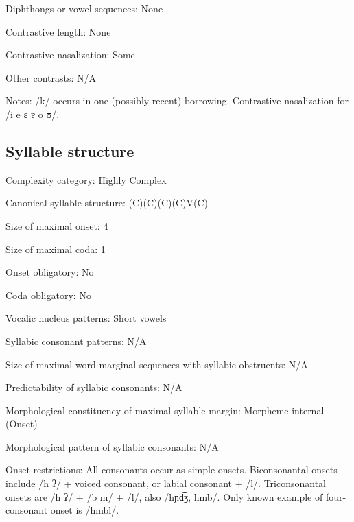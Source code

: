 {\begin{appendixdesc}
\item[Diphthongs or vowel sequences:] None

\item[Contrastive length:] None

\item[Contrastive nasalization:] Some

\item[Other contrasts:] N/A

\item[Notes:] /k/ occurs in one (possibly recent) borrowing. Contrastive nasalization for /i e ɛ ɐ o ʊ/.
\end{appendixdesc}
\subsection*{Syllable structure}
\begin{appendixdesc}

\item[Complexity category:] Highly Complex

\item[Canonical syllable structure:] (C)(C)(C)(C)V(C) \citep[68--76]{Marmion2010}

\item[Size of maximal onset:] 4

\item[Size of maximal coda:] 1

\item[Onset obligatory:] No

\item[Coda obligatory:] No

\item[Vocalic nucleus patterns:] Short vowels

\item[Syllabic consonant patterns:] N/A

\item[Size of maximal word-marginal sequences with syllabic obstruents:] N/A

\item[Predictability of syllabic consonants:] N/A

\item[Morphological constituency of maximal syllable margin:] Morpheme-internal (Onset)

\item[Morphological pattern of syllabic consonants:] N/A

\item[Onset restrictions:] All consonants occur as simple onsets. Biconsonantal onsets include /h ʔ/ + voiced consonant, or labial consonant + /l/. Triconsonantal onsets are /h ʔ/ + /b m/ + /l/, also /hɲd͡ʒ, hmb/. Only known example of four-consonant onset is /hmbl/.


\end{appendixdesc}}
